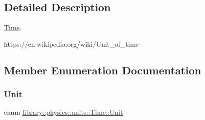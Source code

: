 \subsection{Detailed Description}
\hyperlink{classlibrary_1_1physics_1_1units_1_1_time}{Time}. 

https\+://en.wikipedia.\+org/wiki/\+Unit\+\_\+of\+\_\+time 

\subsection{Member Enumeration Documentation}
\mbox{\label{classlibrary_1_1physics_1_1units_1_1_time_ab876a6a05c9a2f28905f2753bfd64109}} 
\subsubsection{\texorpdfstring{Unit}{Unit}}
{\footnotesize\ttfamily enum \hyperlink{classlibrary_1_1physics_1_1units_1_1_time_ab876a6a05c9a2f28905f2753bfd64109}{library\+::physics\+::units\+::\+Time\+::\+Unit}\hspace{0.3cm}{\ttfamily [strong]}}

